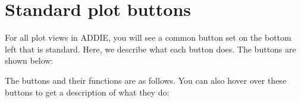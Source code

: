 \section{Standard plot buttons}

For all plot views in ADDIE, you will see a common button set on the bottom left that is standard. Here, we describe what each button does. The buttons are shown below:

\noindent{}

The buttons and their functions are as follows. You can also hover over these buttons to get a description of what they do:

